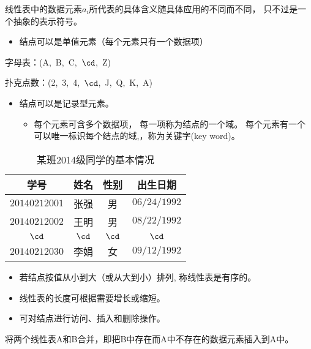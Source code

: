 \begin{frame}\ft{\subsecname} 

线性表中的数据元素$a_i$所代表的具体含义随具体应用的不同而不同，
只不过是一个抽象的表示符号。

\begin{itemize}
\item 
结点可以是单值元素（每个元素只有一个数据项）
\end{itemize}

\begin{li}
字母表：(A,~B,~C,~$\cd$,~Z)
\end{li}	

\begin{li}
扑克点数：(2,~3,~4,~$\cd$,~J,~Q,~K,~A)
\end{li}	

\end{frame}

\begin{frame}\ft{\subsecname}
\begin{itemize}
\item 
结点可以是记录型元素。
\begin{itemize} 
\item 每个元素可含多个数据项， 每一项称为结点的一个域。
每个元素有一个可以唯一标识每个结点的域,，称为{关键字(key word)}。
\end{itemize}
\end{itemize}
\pause 
\begin{table}
\centering
\caption{某班2014级同学的基本情况}
\begin{tabular}{cccc}\hline
学号&姓名&性别&出生日期\\\hline
$20140212001$&张强&男&$06/24/1992$\\
$20140212002$&王明&男&$08/22/1992$\\
$\cd$&$\cd$&$\cd$&$\cd$\\
$20140212030$&李娟&女&$09/12/1992$\\\hline
\end{tabular}  
\end{table}

\end{frame}

\begin{frame}\ft{\subsecname}
\begin{itemize}
\item 
若结点按值从小到大（或从大到小）排列, 
称线性表是{有序}的。
\item 
线性表的长度可根据需要增长或缩短。
\item 
可对结点进行访问、插入和删除操作。
\end{itemize}

\end{frame}


\begin{frame}[fragile]\ft{\subsecname}

\end{frame}



\begin{frame}\ft{\subsecname}
\begin{li}
将两个线性表A和B合并，即把B中存在而A中不存在的数据元素插入到A中。
\end{li}
\pause 

\end{frame}
